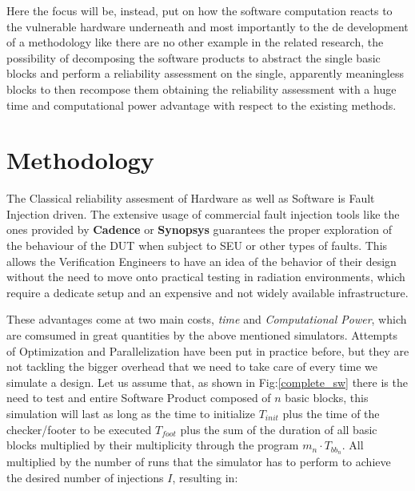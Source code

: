 \documentclass[./dissertation.tex]{subfiles}
\begin{document}
Here the focus will be, instead, put on how the software computation reacts to the vulnerable hardware underneath and most importantly to the de development of a methodology like there are no other example in the related research, the possibility of decomposing the software products to abstract the single basic blocks and perform a reliability assessment on the single, apparently meaningless blocks to then recompose them obtaining the reliability assessment with a huge time and computational power advantage with respect to the existing methods.



%
%


\section{Methodology}
\label{sec:methodology}
The Classical reliability assesment  of Hardware as well as Software is Fault Injection driven. The extensive usage of commercial fault injection tools like the ones provided by \textbf{Cadence} \cite{ICM} or \textbf{Synopsys} \cite{zoix} guarantees the proper exploration of the behaviour of the DUT when subject to SEU or other types of faults. This allows the Verification Engineers to have an idea of the behavior of their design without the need to move onto practical testing in radiation environments, which require a dedicate setup \cite{8368564} and an expensive and not widely available infrastructure.

These advantages come at two main costs, \textit{time} and \textit{Computational Power}, which are comsumed in great quantities by the above mentioned simulators. Attempts of Optimization and Parallelization have been put in practice before, but they are not tackling the bigger overhead that we need to take care of every time we simulate a design. Let us assume that, as shown in Fig:\ref{complete_sw} there is the need to test and entire Software Product composed of $n$ basic blocks, this simulation will last as long as the time to initialize $T_{init}$ plus the time of the checker/footer to be executed $T_{foot}$ plus the sum of the duration of all basic blocks multiplied by their multiplicity through the program $m_n\cdot T_{bb_n}$. All multiplied by the number of runs that the simulator has to perform to achieve the desired number of injections $I$, resulting in:
\end{document}
